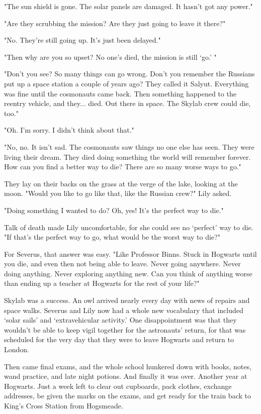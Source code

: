\documentclass[a4paper,11pt]{article}
\begin{document}
"The sun shield is gone. The solar panels are damaged. It hasn't got any power."

"Are they scrubbing the mission? Are they just going to leave it there?"

"No. They're still going up. It's just been delayed."

"Then why are you so upset? No one's died, the mission is still `go.' "

"Don't you see? So many things can go wrong. Don't you remember the Russians put up a space station a couple of years ago? They called it Salyut. Everything was fine until the cosmonauts came back. Then something happened to the reentry vehicle, and they... died. Out there in space. The Skylab crew could die, too."

"Oh. I'm sorry. I didn't think about that."

"No, no. It isn't sad. The cosmonauts saw things no one else has seen. They were living their dream. They died doing something the world will remember forever. How can you find a better way to die? There are so many worse ways to go."

They lay on their backs on the grass at the verge of the lake, looking at the moon. "Would you like to go like that, like the Russian crew?" Lily asked.

"Doing something I wanted to do? Oh, yes! It's the perfect way to die."

Talk of death made Lily uncomfortable, for she could see no `perfect' way to die. "If that's the perfect way to go, what would be the worst way to die?"

For Severus, that answer was easy. "Like Professor Binns. Stuck in Hogwarts until you die, and even then not being able to leave. Never going anywhere. Never doing anything. Never exploring anything new. Can you think of anything worse than ending up a teacher at Hogwarts for the rest of your life?"

Skylab was a success. An owl arrived nearly every day with news of repairs and space walks. Severus and Lily now had a whole new vocabulary that included `solar sails' and `extravehicular activity.' One disappointment was that they wouldn't be able to keep vigil together for the astronauts' return, for that was scheduled for the very day that they were to leave Hogwarts and return to London.

Then came final exams, and the whole school hunkered down with books, notes, wand practice, and late night potions. And finally it was over. Another year at Hogwarts. Just a week left to clear out cupboards, pack clothes, exchange addresses, be given the marks on the exams, and get ready for the train back to King's Cross Station from Hogsmeade.
\end{document}

